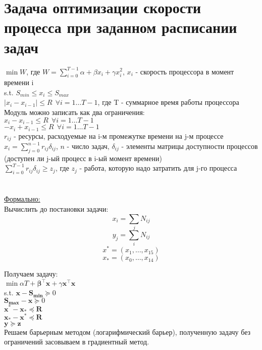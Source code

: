 \documentclass{article}
\begin{document}
\section{Задача оптимизации скорости процесса при заданном расписании задач}

$\min W$, где $W = \sum \limits_{i=0}^{T-1} \alpha + \beta x_i + \gamma x_i^2$, $x_i$ - скорость процессора в момент времени i\\

s.t. $S_{min} \le x_i \le S_{max}$\\

$|x_i-x_{i-1}| \le R ~~ \forall i = 1 \dots T-1$, где T - суммарное время работы процессора \\

Модуль можно записать как два ограничения: \\

$x_i-x_{i-1} \le R ~~ \forall i = 1 \dots T-1$\\
$-x_i+x_{i-1} \le R ~~ \forall i = 1 \dots T-1$\\

$r_{ij}$ - ресурсы, расходуемые на i-м промежутке времени на j-м процессе\\

$x_i = \sum \limits_{j=0}^{n-1} r_{ij}\delta_{ij}$, $n$ - число задач, $\delta_{ij}$ - элементы матрицы доступности процессов (доступен ли j-ый процесс в i-ый момент времени)\\

$\sum \limits_{i=0}^{T-1} r_{ij}\delta_{ij} \ge z_j$, где $z_j$ - работа, которую надо затратить для j-го процесса\\
\\
\\


\underline{Формально:}\\
Вычислить до постановки задачи: \\
$$x_i = \sum\limits_j N_{ij}$$
$$y_j = \sum\limits_i N_{ij}$$
$$x^* = (x_1, \dots, x_{15})$$
$$x_* = (x_0, \dots, x_{14})$$

Получаем задачу:\\
$\min \alpha T + \mathbf{\beta^{\top}x} + \gamma \mathbf{x^{\top}x}$\\
s.t. $\mathbf{x}-\mathbf{S_{min}} \succeq 0$\\
$\mathbf{S_{max}}-\mathbf{x} \succeq 0$\\
$\mathbf{x^*} - \mathbf{x_*} \preceq \mathbf{R}$\\
$\mathbf{x_*} - \mathbf{x^*} \preceq \mathbf{R}$\\
$\mathbf{y} \succeq \mathbf{z}$\\

Решаем барьерным методом (логарифмический барьер), 
полученную задачу без ограничений засовываем в градиентный метод.
\end{document}

